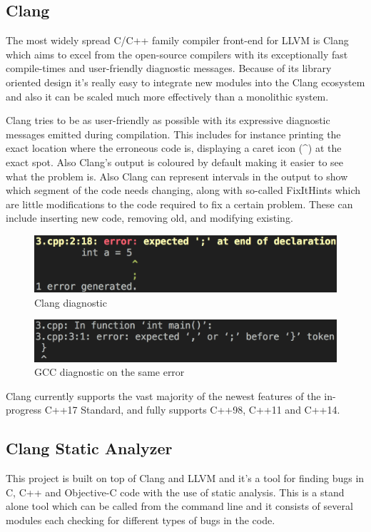 \subsection{Clang}
\par The most widely spread C/C++ family compiler front-end for LLVM is Clang which aims to excel from the open-source compilers with its exceptionally fast compile-times and user-friendly diagnostic messages\cite{clang_features}. Because of its library oriented design it's really easy to integrate new modules into the Clang ecosystem and also it can be scaled much more effectively than a monolithic system. \medskip
\par Clang tries to be as user-friendly as possible with its expressive diagnostic messages emitted during compilation. This includes for instance printing the exact location where the erroneous code is, displaying a caret icon (\textasciicircum) at the exact spot. Also Clang's output is coloured by default making it easier to see what the problem is. Also Clang can represent intervals in the output to show which segment of the code needs changing, along with so-called FixItHints which are little modifications to the code required to fix a certain problem. These can include inserting new code, removing old, and modifying existing.
\begin{figure}[h]
	\caption{Clang diagnostic}
	\includegraphics[scale = 0.42]{images/clang_diag}
\end{figure}
\begin{figure}[h]
	\caption{GCC diagnostic on the same error}
	\includegraphics[scale = 0.352]{images/gcc_diag}
\end{figure}
\par Clang currently supports the vast majority of the newest features of the in-progress C++17 Standard, and fully supports C++98, C++11 and C++14\cite{clang_language_support}. 
\subsection{Clang Static Analyzer}
\par This project is built on top of Clang and LLVM and it's a tool for finding bugs in C, C++ and Objective-C code with the use of static analysis. This is a stand alone tool which can be called from the command line and it consists of several modules each checking for different types of bugs in the code.
